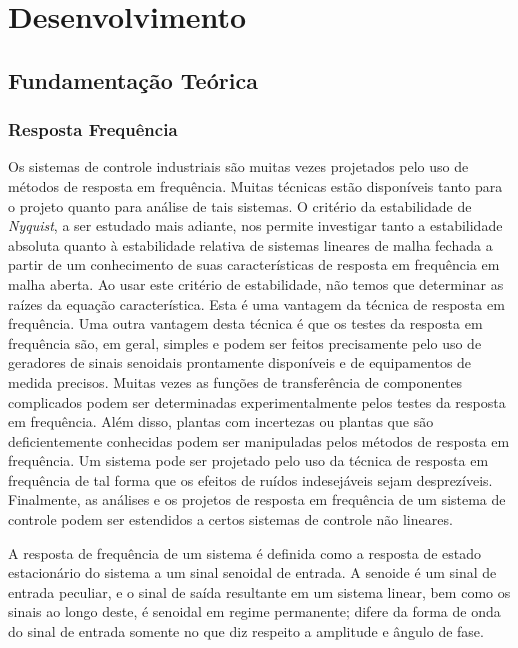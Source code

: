 \setcounter{topnumber}{5}
\setcounter{bottomnumber}{5}
\setcounter{totalnumber}{5}

\chapter{Desenvolvimento}
\section{Fundamentação Teórica}


\subsection{Resposta Frequência}

Os sistemas de controle industriais são muitas vezes projetados pelo uso de métodos de resposta em frequência. Muitas técnicas estão disponíveis tanto para o projeto quanto para análise de tais sistemas. O critério da estabilidade de \textit{Nyquist}, a ser estudado mais adiante, nos permite investigar tanto a estabilidade absoluta quanto à estabilidade relativa de sistemas lineares de malha fechada a partir de um conhecimento de suas características de resposta em frequência em malha aberta. Ao usar este critério de estabilidade, não temos que determinar as raízes da equação característica. Esta é uma vantagem da técnica de resposta em frequência. Uma outra vantagem desta técnica é que os testes da resposta em frequência são, em geral, simples e podem ser feitos precisamente pelo uso de geradores de sinais senoidais prontamente disponíveis e de equipamentos de medida precisos. Muitas vezes as funções de transferência de componentes complicados podem ser determinadas experimentalmente pelos testes da resposta em frequência. Além disso, plantas com incertezas ou plantas que são deficientemente conhecidas podem ser manipuladas pelos métodos de resposta em frequência. Um sistema pode ser projetado pelo uso da técnica de resposta em frequência de tal forma que os efeitos de ruídos indesejáveis sejam desprezíveis. Finalmente, as análises e os projetos de resposta em frequência de um sistema de controle podem ser estendidos a certos sistemas de controle não lineares. 

A resposta de frequência de um sistema é definida como a resposta de estado estacionário do sistema a um sinal senoidal de entrada. A senoide é um sinal de entrada peculiar, e o sinal de saída resultante em um sistema linear, bem como os sinais ao longo deste, é senoidal em regime permanente; difere da forma de onda do sinal de entrada somente no que diz respeito a amplitude e ângulo de fase.
 



